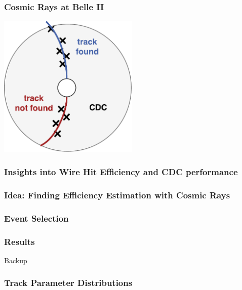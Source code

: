 \documentclass[18pt]{beamer}
\begin{document}
\begin{frame}
  \frametitle{Cosmic Rays at Belle II}
  \includegraphics[width=0.5\textwidth]{figures/cdc_finding_fail_diagram.pdf}
\end{frame}

\begin{frame}
  \frametitle{Insights into Wire Hit Efficiency and CDC performance}
  
\end{frame}

\begin{frame}
  \frametitle{Idea: Finding Efficiency Estimation with Cosmic Rays}
  
\end{frame}

\begin{frame}
  \frametitle{Event Selection}
  
\end{frame}

\begin{frame}
  \frametitle{Results}
  
\end{frame}

\appendix
\backupbegin
\begin{frame}
  \centering \huge
  Backup
\end{frame}

\begin{frame}
  \frametitle{Track Parameter Distributions}
  
\end{frame}
\end{document}
